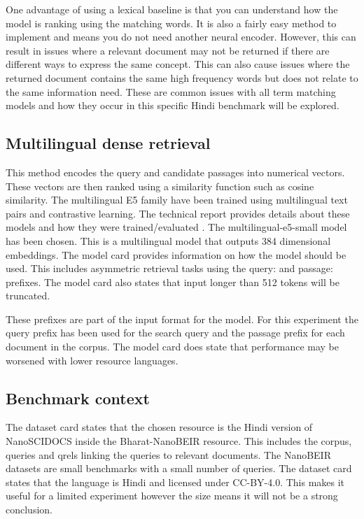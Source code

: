 \documentclass[10pt]{article}
\begin{document}
One advantage of using a lexical baseline is that you can understand how the model is ranking using the matching words. It is also a fairly easy method to implement and means you do not need another neural encoder. However, this can result in issues where a relevant document may not be returned if there are different ways to express the same concept. This can also cause issues where the returned document contains the same high frequency words but does not relate to the same information need. These are common issues with all term matching models and how they occur in this specific Hindi benchmark will be explored.

\subsection{Multilingual dense retrieval}
This method encodes the query and candidate passages into numerical vectors. These vectors are then ranked using a similarity function such as cosine similarity. The multilingual E5 family have been trained using multilingual text pairs and contrastive learning. The technical report provides details about these models and how they were trained/evaluated . The multilingual-e5-small model has been chosen. This is a multilingual model that outputs 384 dimensional embeddings. The model card provides information on how the model should be used. This includes asymmetric retrieval tasks using the query: and passage: prefixes. The model card also states that input longer than 512 tokens will be truncated. \cite{wang2024multilinguale5,e5modelcard}

These prefixes are part of the input format for the model. For this experiment the query prefix has been used for the search query and the passage prefix for each document in the corpus. The model card does state that performance may be worsened with lower resource languages.

\subsection{Benchmark context}
The dataset card states that the chosen resource is the Hindi version of NanoSCIDOCS inside the Bharat-NanoBEIR resource. This includes the corpus, queries and qrels linking the queries to relevant documents. The NanoBEIR datasets are small benchmarks with a small number of queries. The dataset card states that the language is Hindi and licensed under CC-BY-4.0. This makes it useful for a limited experiment however the size means it will not be a strong conclusion. \cite{bharatnanobeir2024}
\end{document}
